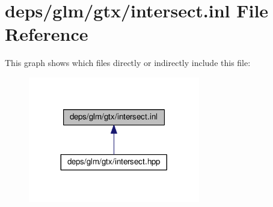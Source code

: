 \hypertarget{intersect_8inl}{}\section{deps/glm/gtx/intersect.inl File Reference}
\label{intersect_8inl}
This graph shows which files directly or indirectly include this file\+:
\nopagebreak
\begin{figure}[H]
\begin{center}
\leavevmode
\includegraphics[width=212pt]{d5/d76/intersect_8inl__dep__incl}
\end{center}
\end{figure}
